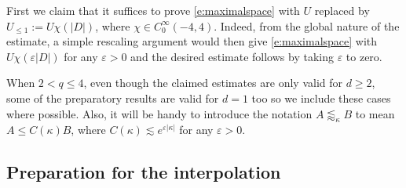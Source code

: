 \documentclass[a4paper]{amsart}
\numberwithin{equation}{section}%
\theoremstyle{plain}%
\theoremstyle{definition}
\theoremstyle{remark}%
\begin{document}
First we claim that it suffices to prove \eqref{e:maximalspace} with $U$ replaced by $U_{\leq 1} := U \chi(|D|)$, where $\chi \in C_0^\infty(-4,4)$. Indeed, from the global nature of the estimate, a simple rescaling argument would then give \eqref{e:maximalspace} with $U \chi(\varepsilon|D|)$ for any $\varepsilon > 0$ and the desired estimate follows by taking $\varepsilon$ to zero.

When $2 < q \leq 4$, even though the claimed estimates are only valid for $d \geq 2$, some of the preparatory results are valid for $d = 1$ too so we include these cases where possible. Also, it will be handy to introduce the notation $A \lessapprox_\kappa B$ to mean $A \leq C(\kappa) B$, where $C(\kappa) \lesssim e^{\varepsilon |\kappa|}$ for any $\varepsilon >0$.

\subsection{Preparation for the interpolation}
\end{document}
